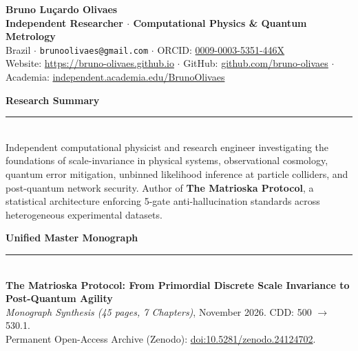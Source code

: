 \documentclass[10pt,a4paper]{article}
\begin{document}
\begin{center}
    {\LARGE \textbf{Bruno Lu\c{c}ardo Olivaes}}\\[0.2cm]
    \textbf{Independent Researcher $\cdot$ Computational Physics \& Quantum Metrology}\\[0.15cm]
    Brazil $\cdot$ \texttt{brunoolivaes@gmail.com} $\cdot$ ORCID: \href{https://orcid.org/0009-0003-5351-446X}{0009-0003-5351-446X}\\[0.1cm]
    Website: \href{https://bruno-olivaes.github.io}{https://bruno-olivaes.github.io} $\cdot$ GitHub: \href{https://github.com/bruno-olivaes}{github.com/bruno-olivaes} $\cdot$ Academia: \href{https://independent.academia.edu/BrunoOlivaes}{independent.academia.edu/BrunoOlivaes}
\end{center}

\vspace{0.2cm}
\noindent\textbf{\Large Research Summary}\\[-0.3cm]
\rule{\textwidth}{0.8pt}\\[0.2cm]
Independent computational physicist and research engineer investigating the foundations of scale-invariance in physical systems, observational cosmology, quantum error mitigation, unbinned likelihood inference at particle colliders, and post-quantum network security. Author of \textbf{The Matrioska Protocol}, a statistical architecture enforcing 5-gate anti-hallucination standards across heterogeneous experimental datasets.

\vspace{0.3cm}
\noindent\textbf{\Large Unified Master Monograph}\\[-0.3cm]
\rule{\textwidth}{0.8pt}\\[0.2cm]
\textbf{The Matrioska Protocol: From Primordial Discrete Scale Invariance to Post-Quantum Agility}\\
\textit{Monograph Synthesis (45 pages, 7 Chapters)}, November 2026. CDD: 500 $\to$ 530.1.\\
Permanent Open-Access Archive (Zenodo): \href{https://doi.org/10.5281/zenodo.24124702}{doi:10.5281/zenodo.24124702}.
\end{document}

